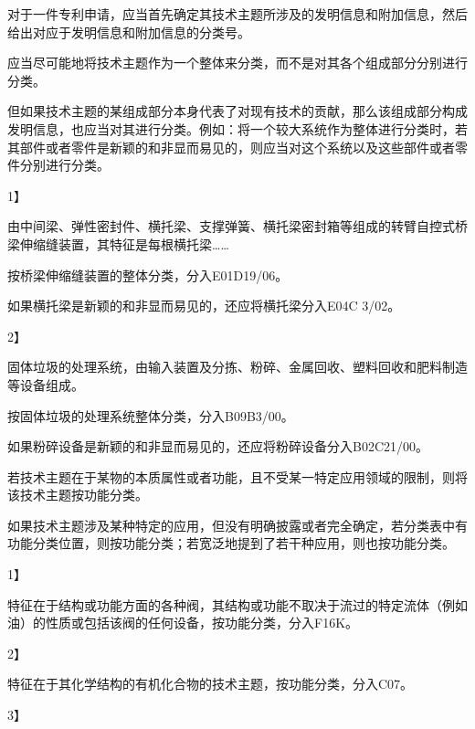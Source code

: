 对于一件专利申请，应当首先确定其技术主题所涉及的发明信息和附加信息，然后给出对应于发明信息和附加信息的分类号。

应当尽可能地将技术主题作为一个整体来分类，而不是对其各个组成部分分别进行分类。

但如果技术主题的某组成部分本身代表了对现有技术的贡献，那么该组成部分构成发明信息，也应当对其进行分类。例如：将一个较大系统作为整体进行分类时，若其部件或者零件是新颖的和非显而易见的，则应当对这个系统以及这些部件或者零件分别进行分类。

{1】\par}

由中间梁、弹性密封件、横托梁、支撑弹簧、横托梁密封箱等组成的转臂自控式桥梁伸缩缝装置，其特征是每根横托梁……

按桥梁伸缩缝装置的整体分类，分入E01D19/06。

如果横托梁是新颖的和非显而易见的，还应将横托梁分入E04C 3/02。

{2】\par}

固体垃圾的处理系统，由输入装置及分拣、粉碎、金属回收、塑料回收和肥料制造等设备组成。

按固体垃圾的处理系统整体分类，分入B09B3/00。

如果粉碎设备是新颖的和非显而易见的，还应将粉碎设备分入B02C21/00。

若技术主题在于某物的本质属性或者功能，且不受某一特定应用领域的限制，则将该技术主题按功能分类。

如果技术主题涉及某种特定的应用，但没有明确披露或者完全确定，若分类表中有功能分类位置，则按功能分类；若宽泛地提到了若干种应用，则也按功能分类。

{1】\par}

特征在于结构或功能方面的各种阀，其结构或功能不取决于流过的特定流体（例如油）的性质或包括该阀的任何设备，按功能分类，分入F16K。

{2】\par}

特征在于其化学结构的有机化合物的技术主题，按功能分类，分入C07。

{3】\par}

